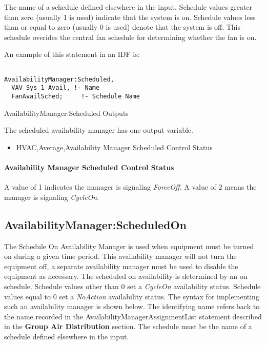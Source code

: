 The name of a schedule defined elsewhere in the input. Schedule values greater than zero (usually 1 is used) indicate that the system is on. Schedule values less than or equal to zero (usually 0 is used) denote that the system is off. This schedule overides the central fan schedule for determining whether the fan is on.

An example of this statement in an IDF is:

\begin{lstlisting}

AvailabilityManager:Scheduled,
  VAV Sys 1 Avail, !- Name
  FanAvailSched;     !- Schedule Name
\end{lstlisting}

AvailabilityManager:Scheduled Outputs

The scheduled availability manager has one output variable.

\begin{itemize}
\tightlist
\item
  HVAC,Average,Availability Manager Scheduled Control Status
\end{itemize}

\paragraph{Availability Manager Scheduled Control Status}\label{availability-manager-scheduled-control-status}

A value of 1 indicates the manager is signaling \emph{ForceOff}. A value of 2 means the manager is signaling \emph{CycleOn}.

\subsection{AvailabilityManager:ScheduledOn}\label{availabilitymanagerscheduledon}

The Schedule On Availability Manager is used when equipment must be turned on during a given time period. This availability manager will not turn the equipment off, a separate availability manager must be used to disable the equipment as necessary. The scheduled on availability is determined by an on schedule. Schedule values other than 0 set a \emph{CycleOn} availability status. Schedule values equal to 0 set a \emph{NoAction} availability status. The syntax for implementing such an availability manager is shown below. The identifying name refers back to the name recorded in the AvailabilityManagerAssignmentList statement described in the \textbf{Group Air Distribution} section. The schedule must be the name of a schedule defined elsewhere in the input.

